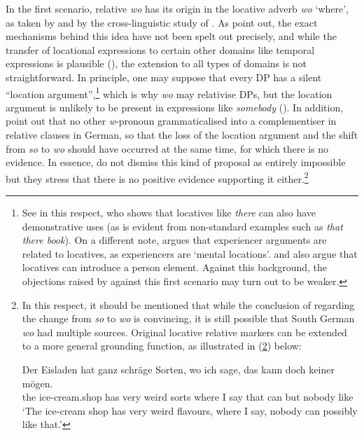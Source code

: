 In the first scenario, relative \textit{wo} has its origin in the locative adverb \textit{wo} `where', as taken by \citet{bidesecognolapadovan2012} and by the cross-linguistic study of \citet{fiorentino2007}. As \citet{brandnerbraeuning2013} point out, the exact mechanisms behind this idea have not been spelt out precisely, and while the transfer of locational expressions to certain other domains like temporal expressions is plausible (\citealt{hoppertraugott1993}), the extension to all types of domains is not straightforward. In principle, one may suppose that every DP has a silent ``location argument'',\footnote{See \citet[65--79]{kayne2005} in this respect, who shows that locatives like \textit{there} can also have demonstrative uses (as is evident from non-standard examples such as \textit{that there book}). On a different note, \citet{landau2010} argues that experiencer arguments are related to locatives, as experiencers are `mental locations'. \citet{brody2013} and \citet{sluckinkastner2022} also argue that locatives can introduce a person element. Against this background, the objections raised by \citet{brandnerbraeuning2013} against this first scenario may turn out to be weaker.} which is why \textit{wo} may relativise DPs, but the location argument is unlikely to be present in expressions like \textit{somebody} (\citealt[139--140]{brandnerbraeuning2013}). In addition, \citet[140--141]{brandnerbraeuning2013} point out that no other \textit{w}-pronoun grammaticalised into a complementiser in relative clauses in German, so that the loss of the location argument and the shift from \textit{so} to \textit{wo} should have occurred at the same time, for which there is no evidence. In essence, \citet[141]{brandnerbraeuning2013} do not dismiss this kind of proposal as entirely impossible but they stress that there is no positive evidence supporting it either.\footnote{In this respect, it should be mentioned that while the conclusion of \citet{brandnerbraeuning2013} regarding the change from \textit{so} to \textit{wo} is convincing, it is still possible that South German \textit{wo} had multiple sources. Original locative relative markers can be extended to a more general grounding function, as illustrated in (\ref{eis}) below:

\ea \gll Der Eisladen hat ganz schräge Sorten, wo ich sage, das kann doch keiner mögen. \label{eis}\\
the ice-cream.shop has very weird sorts where I say that can but nobody like\\
\glt `The ice-cream shop has very weird flavours, where I say, nobody can possibly like that.'
\z

}
